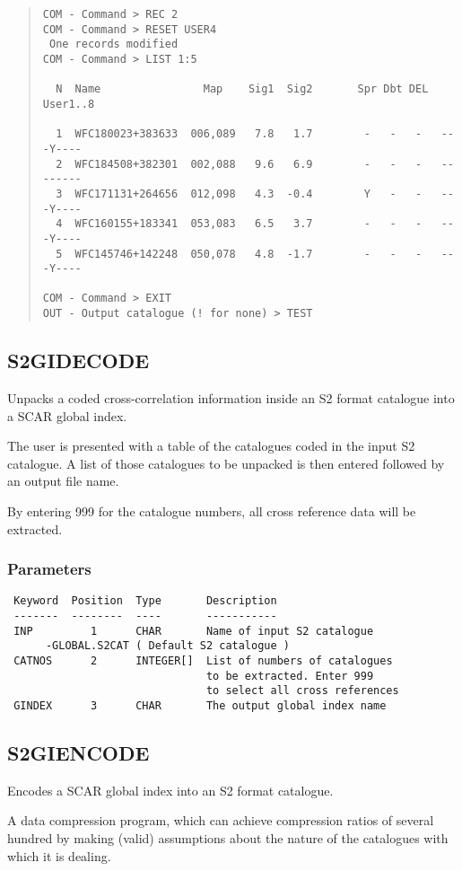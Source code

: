 \documentclass{book}
\renewcommand{\_}{{\tt\char'137}}     %
\begin{document}
\begin{quote}
\begin{verbatim}
COM - Command > REC 2
COM - Command > RESET USER4
 One records modified
COM - Command > LIST 1:5
 
  N  Name                Map    Sig1  Sig2       Spr Dbt DEL  User1..8
 
  1  WFC180023+383633  006,089   7.8   1.7        -   -   -   ---Y----
  2  WFC184508+382301  002,088   9.6   6.9        -   -   -   --------
  3  WFC171131+264656  012,098   4.3  -0.4        Y   -   -   ---Y----
  4  WFC160155+183341  053,083   6.5   3.7        -   -   -   ---Y----
  5  WFC145746+142248  050,078   4.8  -1.7        -   -   -   ---Y----
 
COM - Command > EXIT
OUT - Output catalogue (! for none) > TEST
\end{verbatim}\end{quote}
\subsection{S2GIDECODE}
Unpacks a coded cross-correlation information inside an S2
format catalogue into a SCAR global index.
 
The user is presented with a table of the catalogues coded
in the input S2 catalogue. A list of those catalogues to be
unpacked is then entered followed by an output file name.
 
By entering 999 for the catalogue numbers, all cross reference
data will be extracted.
 
\subsubsection{Parameters}
\begin{verbatim}
 Keyword  Position  Type       Description
 -------  --------  ----       -----------
 INP         1      CHAR       Name of input S2 catalogue
      -GLOBAL.S2CAT ( Default S2 catalogue )
 CATNOS      2      INTEGER[]  List of numbers of catalogues
                               to be extracted. Enter 999
                               to select all cross references
 GINDEX      3      CHAR       The output global index name
\end{verbatim}\subsection{S2GIENCODE}
Encodes a SCAR global index into an S2 format catalogue.
 
A data compression program, which can achieve compression
ratios of several hundred by making (valid) assumptions
about the nature of the catalogues with which it is dealing.
 
\end{document}
